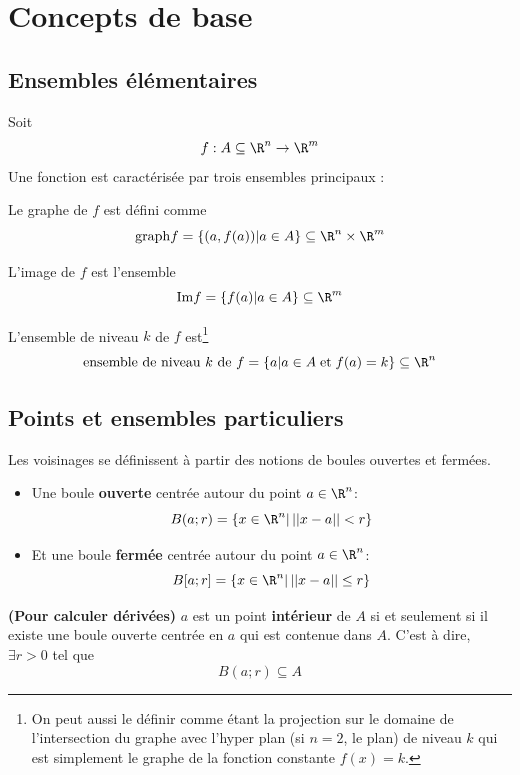 \section{Concepts de base}

\subsection{Ensembles élémentaires}
Soit
\[ f : A \subseteq \R^n \rightarrow \R^m \]
Une fonction est caractérisée par trois ensembles principaux :
\begin{mydef} [Graphe de $f$] Le graphe de $f$ est défini comme
	\[ \mathrm{graph} f = \{(a,f(a))| a \in A\} \subseteq \R^n \times \R^m \]
\end{mydef}

\begin{mydef} [Image de $f$] L'image de $f$ est l'ensemble
	\[ \mathrm{Im} f = \{ f(a) | a \in A\} \subseteq \R^m \]
\end{mydef}

\begin{mydef} 
	L'ensemble de niveau $k$ de $f$ est\footnote{On peut aussi le définir comme étant la projection sur le domaine de l'intersection du graphe avec l'hyper plan (si $n=2$, le plan) de niveau $k$ qui est simplement le graphe de la fonction constante $f(x) = k$.}
	\[ \text{ensemble de niveau } k\text{ de }f = \{ a | a \in A \;\text{et}\; f(a) = k \} \subseteq \R^n \]
\end{mydef}


\subsection{Points et ensembles particuliers}

\begin{mydef} [Boules] Les voisinages se définissent à partir des notions de boules ouvertes et fermées.
	\begin{itemize}
		\item Une boule \textbf{ouverte} centrée autour du point $a \in \R^n$:
			\[ B(a;r) = \{ x \in \R^n |\,||x-a|| < r \} \]
		\item Et une boule \textbf{fermée} centrée autour du point $a \in \R^n$:
			\[ B[a;r] = \{ x \in \R^n |\,||x-a|| \leq r \} \]
	\end{itemize}
\end{mydef}

\begin{mydef}
	\textbf{(Pour calculer dérivées)} $a$ est un point \textbf{intérieur} de $A$ si et seulement si il existe une boule ouverte centrée en $a$ qui est contenue dans $A$.
	C'est à dire, $\exists r > 0$ tel que
	\[ B(a; r) \subseteq A \]
\end{mydef}


